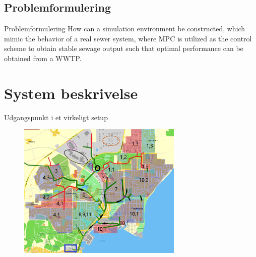 


\subsection{Problemformulering}

\begin{frame}{Problemformulering}{}
\vfill\vfill\centering
How can a simulation environment be constructed, which mimic the behavior of a real
sewer system, where MPC is utilized as the control scheme to obtain stable sewage output
such that optimal performance can be obtained from a WWTP.
\vfill\vfill
\end{frame}

\section{System beskrivelse} %


\begin{frame}{Udgangspunkt i et virkeligt setup}{}
\begin{figure}[H]
\centering
\includegraphics[width=0.7\textwidth]{Sections/pictures/kloakgrid_simplified10.png}
\end{figure}
\end{frame}

